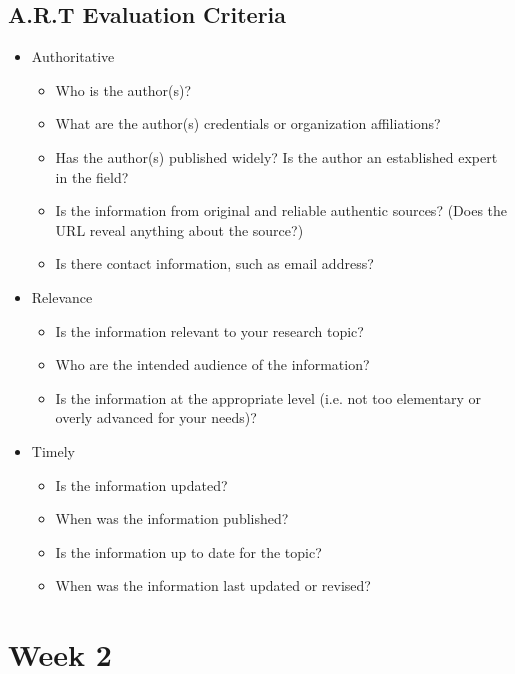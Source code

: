 \documentclass{article}
\begin{document}
\begin{multicols}{2}
\subsection{A.R.T Evaluation Criteria}
\begin{itemize}
	\item Authoritative
	\begin{itemize}
		\item Who is the author(s)?
		\item What are the author(s) credentials or organization affiliations?
		\item Has the author(s) published widely? Is the author an established expert in the field?
		\item Is the information from original and reliable authentic sources? (Does the URL reveal anything about the source?)
		\item Is there contact information, such as email address?
	\end{itemize}
	\item Relevance
	\begin{itemize}
		\item Is the information relevant to your research topic?
		\item Who are the intended audience of the information?
		\item Is the information at the appropriate level (i.e. not too elementary or overly advanced for your needs)?
	\end{itemize}
	\item Timely
	\begin{itemize}
		\item Is the information updated?
		\item When was the information published?
		\item Is the information up to date for the topic?
		\item When was the information last updated or revised?
	\end{itemize}
\end{itemize}


\section{Week 2}

\end{multicols}
\end{document}

